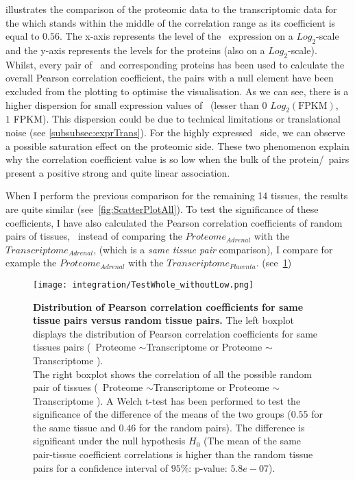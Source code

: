  illustrates the comparison of the proteomic data to the
transcriptomic data for the  which stands within the middle of the
correlation range as its coefficient is equal to $0.56$.
The x-axis represents the level of the \mRNAs\
expression on a $Log_{2}$-scale and the y-axis represents the levels for the
proteins (also on a $Log_{2}$-scale). Whilst, every pair of \mRNA\ and
corresponding proteins has been used to calculate the overall Pearson correlation
coefficient, the pairs with a null element have been excluded from the plotting
to optimise the visualisation. As we can see, there is a higher dispersion for
small expression values of \mRNAs\ (lesser than $0$ $Log_{2}(\text{FPKM})$, \ie\
$1$ FPKM). This dispersion could be due to technical limitations or translational
noise (see \cref{subsubsec:exprTrans}). For the highly expressed \mRNAs\ side,
we can observe a possible saturation effect on the proteomic side. These two
phenomenon explain why the correlation coefficient value is so low when the
bulk of the protein/\mRNA\ pairs present a positive strong and quite linear
association.

When I perform the previous comparison for the remaining 14 tissues, the results are
quite similar (see~\cref{fig:ScatterPlotAll}). To test the significance of these
coefficients, I have also calculated the Pearson correlation coefficients of
random pairs of tissues, \ie\ instead of comparing the $Proteome_{Adrenal}$ with
the $Transcriptome_{Adrenal}$, (which is a \emph{same tissue pair} comparison),
I compare for example the $Proteome_{Adrenal}$ with the $Transcriptome_{Placenta}$.
(see~\cref{fig:TestSig})

\begin{figure}[!htbp]
    \texttt{[image: integration/TestWhole\_withoutLow.png]}\centering
    \caption[Distribution of Pearson correlation coefficients for same tissue
    pairs versus random tissue pairs]{\label{fig:TestSig}\textbf{Distribution of
    Pearson correlation coefficients for same tissue pairs versus random tissue
    pairs.} The left boxplot displays the distribution of Pearson correlation
    coefficients for same tissues pairs (\eg\
Proteome\textsubscript{ }$\sim$Transcriptome\textsubscript{ }
or
Proteome\textsubscript{ }$\sim$Transcriptome\textsubscript{ }).
    \\The right boxplot shows the correlation of all the possible random
    pair of tissues (\eg\
Proteome\textsubscript{ }$\sim$Transcriptome\textsubscript{ }
or
Proteome\textsubscript{\tissue{Heart} }$\sim$Transcriptome\textsubscript{ }).
    A Welch t-test has been performed to test the significance of the
    difference of the means of the two groups ($0.55$ for the same tissue and
    $0.46$ for the random pairs). The difference is significant under the null
    hypothesis $H_{0}$ (The mean of the same pair-tissue coefficient correlations
    is higher than the random tissue pairs for a confidence interval of $95\%$:
    p-value: $5.8e-07$).}
\end{figure}

